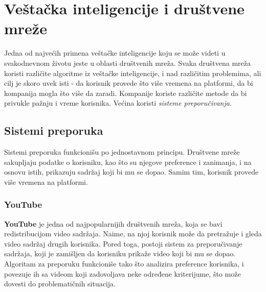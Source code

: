 \documentclass[a4paper]{article}
\newtheorem{primer}{Primer}[section]
\begin{document}

\section{Veštačka inteligencije i društvene mreže}
\label{sec:preporučivanje}

Jedna od najvećih primena veštačke inteligencije koju se može videti u svakodnevnom životu jeste u oblasti društvenih mreža. Svaka društvena mreža koristi različite algoritme iz veštačke inteligencije, i nad različitim problemima,
ali cilj je skoro uvek isti - da korisnik provede što više vremena na platformi, da bi kompanija mogla što više da zaradi.
Kompanije koriste različite metode da bi privukle pažnju i vreme korisnika. Većina koristi \emph{sisteme preporučivanja}.
\subsection{Sistemi preporuka}
Sistemi preporuka funkcionišu po jednostavnom principu. Društvene mreže sakupljaju podatke o korisniku, kao što su njegove preference i zanimanja, i na osnovu istih, prikazuju sadržaj koji bi mu se dopao. Samim tim, korisnik provede više vremena na platformi.
\subsubsection{YouTube}
\textbf{YouTube} je jedna od najpopularnijih društvenih mreža, koja se bavi redistribucijom video sadržaja. Naime, na njoj korisnik može da pretražuje i gleda video sadržaj drugih korisnika. Pored toga, postoji sistem za preporučivanje sadržaja, koji je zamišljen da korisniku prikaže video koji bi mu se dopao. Algoritam za preporuku funkcioniše tako što analizira preference korisnika, i povezuje ih sa videom koji zadovoljava neke određene kriterijume, što može dovesti do problematičnih situacija.
\end{document}
